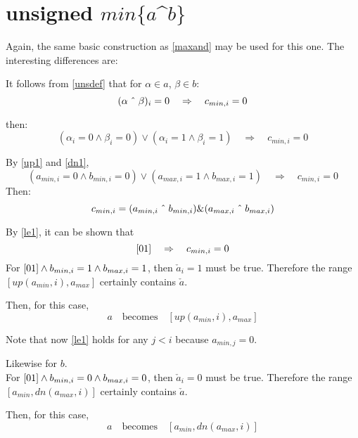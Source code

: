 \documentclass{article}
\begin{document}
\section{unsigned $min\{a$\^{}$b\}$}

Again, the same basic construction as \ref{maxand} may be used for this one. 
The interesting differences are:

It follows from \eqref{unsdef} that for $\alpha \in a$, $\beta \in b$:
\begin{equation}
(\alpha \; \text{\^{}} \; \beta)_i = 0
\quad \Rightarrow \quad c_{min,i} = 0
\end{equation}

then:
\begin{equation*}
(\alpha_i = 0 \wedge \beta_i = 0) \vee (\alpha_i = 1 \wedge \beta_i = 1) 
\quad \Rightarrow \quad c_{min,i} = 0
\end{equation*}

By \eqref{up1} and \eqref{dn1},
\begin{equation*}
(a_{min,i} = 0 \wedge b_{min,i} = 0) \vee (a_{max,i} = 1 \wedge b_{max,i} = 1) 
\quad \Rightarrow \quad c_{min,i} = 0
\end{equation*}
Then:
\begin{equation}\label{minxor}
c_{min,i} = (a_{min,i} \; \text{\^{}}\; b_{min,i}) 
\text{\&} (a_{max,i} \; \text{\^{}}\; b_{max,i}) 
\end{equation}

By \eqref{le1}, it can be shown that
\begin{equation*}
\eqref{01} \quad \Rightarrow \quad 
c_{min,i} = 0 
\end{equation*}
For $\eqref{01} \wedge b_{min,i} = 1 \wedge b_{max,i} = 1$, 
then $ \check a_i = 1$ must be true.
Therefore the range $[up(a_{min}, i), a_{max}]$ certainly contains $\check a$.

Then, for this case, 
\begin{equation}\label{0111minxor} 
a \quad \text{becomes} \quad [up(a_{min}, i), a_{max}]
\end{equation}

Note that now \eqref{le1} holds for any $j < i$ because $a_{min,j} = 0$. 

Likewise for $b$.\\
For $\eqref{01}  \wedge  b_{min,i} = 0 \wedge b_{max,i} = 0$, 
then $\check a_i = 0$ must be true.
Therefore the range $[a_{min}, dn(a_{max},i)]$ certainly contains $\check a$.

Then, for this case, 
\begin{equation}\label{0100minxor} 
a \quad \text{becomes} \quad [a_{min}, dn(a_{max},i)]
\end{equation}
\end{document}
